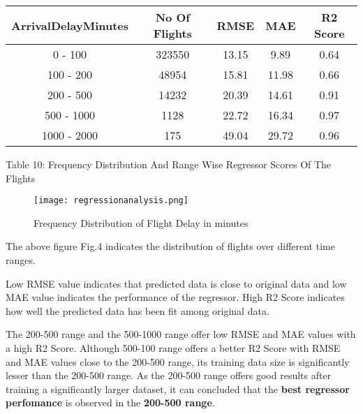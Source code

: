 \documentclass[12pt,letter-paper]{article}
\begin{document}
    \begin{table}[H]
        \begin{center}
            \begin{tabular}{ |c|c|c|c|c| } 
                \hline
                ArrivalDelayMinutes & No Of Flights & RMSE & MAE & R2 Score\\ 
                \hline
                0 - 100 & 323550 & 13.15 & 9.89 & 0.64\\ 
                \hline
                100 - 200 & 48954 & 15.81 & 11.98 & 0.66\\ 
                \hline
                200 - 500 & 14232 & 20.39 & 14.61 & 0.91\\ 
                \hline
                500 - 1000 & 1128 & 22.72 & 16.34 & 0.97\\ 
                \hline
                1000 - 2000 & 175 & 49.04 & 29.72 & 0.96\\ 
                \hline
        \end{tabular}
        \end{center}
        \begin{center}
            Table 10: Frequency Distribution And Range Wise Regressor Scores Of The Flights
    \end{center}
    \end{table}
    
    \begin{figure}[H]%
        \begin{center}
            \texttt{[image: regressionanalysis.png]}%
                \caption{Frequency Distribution of Flight Delay in minutes}  
        \end{center}
    \end{figure}
    
    The above figure Fig.4 indicates the distribution of flights over different time ranges. 
    
    Low RMSE value indicates that predicted data is close to original data and low MAE value indicates the performance of the regressor. High R2 Score indicates how well the predicted data has been fit among original data.
    
    The 200-500 range and the 500-1000 range offer low RMSE and MAE values with a high R2 Score. Although 500-100 range offers a better R2 Score with RMSE and MAE values close to the 200-500 range, its training data size is significantly lesser than the 200-500 range. As the 200-500 range offers good results after training a significantly larger dataset, it can concluded that the {\bfseries best regressor perfomance} is observed in the {\bfseries 200-500 range}. 
    
\end{document}
